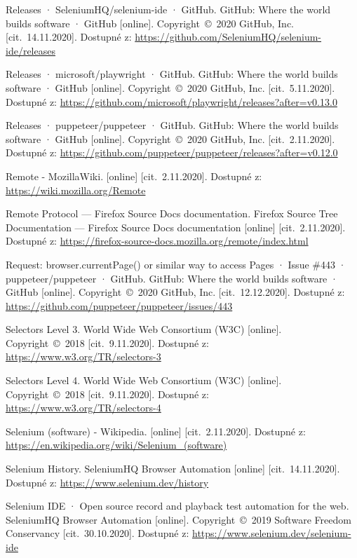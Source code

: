 \begin{thebibliography}{99}
 Releases · SeleniumHQ/selenium-ide · GitHub. GitHub: Where the world builds software · GitHub [online]. Copyright~©~2020 GitHub, Inc. [cit.~14.11.2020]. Dostupné z: \url{https://github.com/SeleniumHQ/selenium-ide/releases}

 Releases · microsoft/playwright · GitHub. GitHub: Where the world builds software · GitHub [online]. Copyright~©~2020 GitHub, Inc. [cit.~5.11.2020]. Dostupné z: \url{https://github.com/microsoft/playwright/releases?after=v0.13.0}

 Releases · puppeteer/puppeteer · GitHub. GitHub: Where the world builds software · GitHub [online]. Copyright~©~2020 GitHub, Inc. [cit.~2.11.2020]. Dostupné z: \url{https://github.com/puppeteer/puppeteer/releases?after=v0.12.0}

 Remote - MozillaWiki. [online] [cit.~2.11.2020]. Dostupné z: \url{https://wiki.mozilla.org/Remote}

 Remote Protocol — Firefox Source Docs documentation. Firefox Source Tree Documentation — Firefox Source Docs documentation [online] [cit.~2.11.2020]. Dostupné z: \url{https://firefox-source-docs.mozilla.org/remote/index.html}

 Request: browser.currentPage() or similar way to access Pages · Issue \#443 · puppeteer/puppeteer · GitHub. GitHub: Where the world builds software · GitHub [online]. Copyright~©~2020 GitHub, Inc. [cit.~12.12.2020]. Dostupné z: \url{https://github.com/puppeteer/puppeteer/issues/443}

 Selectors Level 3. World Wide Web Consortium (W3C) [online]. Copyright~©~2018 [cit.~9.11.2020]. Dostupné z: \url{https://www.w3.org/TR/selectors-3}

 Selectors Level 4. World Wide Web Consortium (W3C) [online]. Copyright~©~2018 [cit.~9.11.2020]. Dostupné z: \url{https://www.w3.org/TR/selectors-4}

 Selenium (software) - Wikipedia. [online] [cit.~2.11.2020]. Dostupné z: \url{https://en.wikipedia.org/wiki/Selenium_(software)}

 Selenium History. SeleniumHQ Browser Automation [online] [cit.~14.11.2020]. Dostupné z: \url{https://www.selenium.dev/history}

 Selenium IDE · Open source record and playback test automation for the web. SeleniumHQ Browser Automation [online]. Copyright~©~2019 Software Freedom Conservancy [cit.~30.10.2020]. Dostupné z: \url{https://www.selenium.dev/selenium-ide}


\end{thebibliography}
